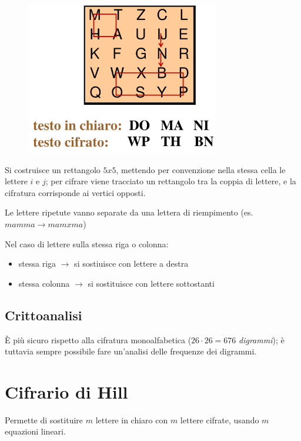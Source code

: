 \begin{figure}[H]
    \centering 
    \includegraphics[width=0.8\linewidth]{chapters/chap02/images/playfair.png}
\end{figure}

\noindent Si costruisce un rettangolo $5x5$, mettendo per convenzione nella stessa 
cella le lettere $i$ e $j$; per cifrare viene tracciato un rettangolo tra 
la coppia di lettere, e la cifratura corrisponde ai vertici opposti. 

\noindent Le lettere ripetute vanno separate da una lettera di riempimento (es. $mamma \rightarrow
mamxma$)

\noindent Nel caso di lettere sulla stessa riga o colonna:
\begin{itemize}
    \item stessa riga $\rightarrow$ si sostiuisce con lettere a destra 
    \item stessa colonna $\rightarrow$ si sostituisce con lettere sottostanti
\end{itemize}

\subsection{Crittoanalisi}

È più sicuro rispetto alla cifratura monoalfabetica ($26\cdot26=676$ \textit{digrammi}); è tuttavia 
sempre possibile fare un'analisi delle frequenze dei digrammi.

\section{Cifrario di Hill}

Permette di 
sostituire $m$ lettere in chiaro con $m$ lettere cifrate, usando $m$ equazioni 
lineari. 


